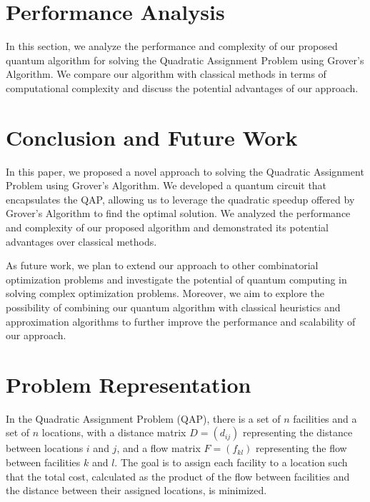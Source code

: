 
\section{Performance Analysis}\label{sec:analysis}

In this section, we analyze the performance and complexity of our proposed quantum algorithm for solving the Quadratic Assignment Problem using Grover's Algorithm. We compare our algorithm with classical methods in terms of computational complexity and discuss the potential advantages of our approach.


\section{Conclusion and Future Work}\label{sec:conclusion}

In this paper, we proposed a novel approach to solving the Quadratic Assignment Problem using Grover's Algorithm. We developed a quantum circuit that encapsulates the QAP, allowing us to leverage the quadratic speedup offered by Grover's Algorithm to find the optimal solution. We analyzed the performance and complexity of our proposed algorithm and demonstrated its potential advantages over classical methods.

As future work, we plan to extend our approach to other combinatorial optimization problems and investigate the potential of quantum computing in solving complex optimization problems. Moreover, we aim to explore the possibility of combining our quantum algorithm with classical heuristics and approximation algorithms to further improve the performance and scalability of our approach.


\section{Problem Representation}

In the Quadratic Assignment Problem (QAP), there is a set of $n$ facilities and a set of $n$ locations, with a distance matrix $D = (d_{ij})$ representing the distance between locations $i$ and $j$, and a flow matrix $F = (f_{kl})$ representing the flow between facilities $k$ and $l$. The goal is to assign each facility to a location such that the total cost, calculated as the product of the flow between facilities and the distance between their assigned locations, is minimized.


